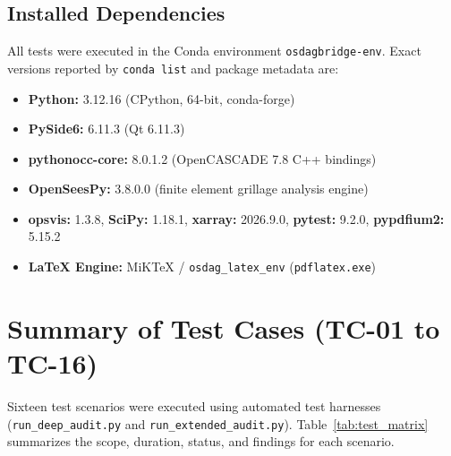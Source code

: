 \documentclass[11pt,a4paper]{article}
\begin{document}
\subsection{Installed Dependencies}
All tests were executed in the Conda environment \texttt{osdagbridge-env}. Exact versions reported by \texttt{conda list} and package metadata are:
\begin{itemize}
    \item \textbf{Python:} 3.12.16 (CPython, 64-bit, conda-forge)
    \item \textbf{PySide6:} 6.11.3 (Qt 6.11.3)
    \item \textbf{pythonocc-core:} 8.0.1.2 (OpenCASCADE 7.8 C++ bindings)
    \item \textbf{OpenSeesPy:} 3.8.0.0 (finite element grillage analysis engine)
    \item \textbf{opsvis:} 1.3.8, \textbf{SciPy:} 1.18.1, \textbf{xarray:} 2026.9.0, \textbf{pytest:} 9.2.0, \textbf{pypdfium2:} 5.15.2
    \item \textbf{LaTeX Engine:} MiKTeX / \texttt{osdag\_latex\_env} (\texttt{pdflatex.exe})
\end{itemize}

\section{Summary of Test Cases (TC-01 to TC-16)}

Sixteen test scenarios were executed using automated test harnesses (\texttt{run\_deep\_audit.py} and \texttt{run\_extended\_audit.py}). Table~\ref{tab:test_matrix} summarizes the scope, duration, status, and findings for each scenario.
\end{document}
